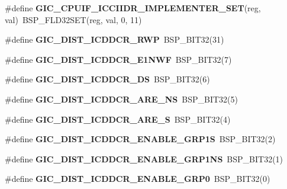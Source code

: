 \begin{DoxyCompactItemize}
\#define {\bfseries G\+I\+C\+\_\+\+C\+P\+U\+I\+F\+\_\+\+I\+C\+C\+I\+I\+D\+R\+\_\+\+I\+M\+P\+L\+E\+M\+E\+N\+T\+E\+R\+\_\+\+S\+ET}(reg,  val)~B\+S\+P\+\_\+\+F\+L\+D32\+S\+ET(reg, val, 0, 11)
\item 
\mbox{\label{arm-gic-regs_8h_a437212a7f17adf841388c1b0ef436349}} 
\#define {\bfseries G\+I\+C\+\_\+\+D\+I\+S\+T\+\_\+\+I\+C\+D\+D\+C\+R\+\_\+\+R\+WP}~B\+S\+P\+\_\+\+B\+I\+T32(31)
\item 
\mbox{\label{arm-gic-regs_8h_a23f31fbefdade88c97824f2bb3d07812}} 
\#define {\bfseries G\+I\+C\+\_\+\+D\+I\+S\+T\+\_\+\+I\+C\+D\+D\+C\+R\+\_\+\+E1\+N\+WF}~B\+S\+P\+\_\+\+B\+I\+T32(7)
\item 
\mbox{\label{arm-gic-regs_8h_a2c8a3b21fd142dd4f312bac6018ff189}} 
\#define {\bfseries G\+I\+C\+\_\+\+D\+I\+S\+T\+\_\+\+I\+C\+D\+D\+C\+R\+\_\+\+DS}~B\+S\+P\+\_\+\+B\+I\+T32(6)
\item 
\mbox{\label{arm-gic-regs_8h_a844c3a9bb358d18fbbfffde67452aee4}} 
\#define {\bfseries G\+I\+C\+\_\+\+D\+I\+S\+T\+\_\+\+I\+C\+D\+D\+C\+R\+\_\+\+A\+R\+E\+\_\+\+NS}~B\+S\+P\+\_\+\+B\+I\+T32(5)
\item 
\mbox{\label{arm-gic-regs_8h_a5b84ad8975e04e08d119d208730d6013}} 
\#define {\bfseries G\+I\+C\+\_\+\+D\+I\+S\+T\+\_\+\+I\+C\+D\+D\+C\+R\+\_\+\+A\+R\+E\+\_\+S}~B\+S\+P\+\_\+\+B\+I\+T32(4)
\item 
\mbox{\label{arm-gic-regs_8h_a4cd077a037f2256b6d1f4e62bb978072}} 
\#define {\bfseries G\+I\+C\+\_\+\+D\+I\+S\+T\+\_\+\+I\+C\+D\+D\+C\+R\+\_\+\+E\+N\+A\+B\+L\+E\+\_\+\+G\+R\+P1S}~B\+S\+P\+\_\+\+B\+I\+T32(2)
\item 
\mbox{\label{arm-gic-regs_8h_ad4f6a4ab7a5cf0fa9c02f6d6f07d5991}} 
\#define {\bfseries G\+I\+C\+\_\+\+D\+I\+S\+T\+\_\+\+I\+C\+D\+D\+C\+R\+\_\+\+E\+N\+A\+B\+L\+E\+\_\+\+G\+R\+P1\+NS}~B\+S\+P\+\_\+\+B\+I\+T32(1)
\item 
\mbox{\label{arm-gic-regs_8h_aa2d8962ea44fe80a3fe1ed8b187f91ba}} 
\#define {\bfseries G\+I\+C\+\_\+\+D\+I\+S\+T\+\_\+\+I\+C\+D\+D\+C\+R\+\_\+\+E\+N\+A\+B\+L\+E\+\_\+\+G\+R\+P0}~B\+S\+P\+\_\+\+B\+I\+T32(0)

\end{DoxyCompactItemize}
